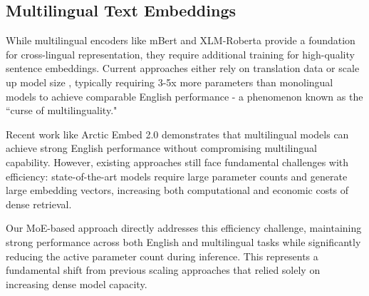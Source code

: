 \subsection{Multilingual Text Embeddings}
While multilingual encoders like mBert \citep{devlin2019bert} and XLM-Roberta \citep{conneau2020unsupervisedcrosslingualrepresentationlearning} provide a foundation for cross-lingual representation, they require additional training for high-quality sentence embeddings. Current approaches either rely on translation data \citep{reimers2020makingmonolingualsentenceembeddings} or scale up model size \citep{wang2024multilinguale5textembeddings, chen2024bgem3embeddingmultilingualmultifunctionality}, typically requiring 3-5x more parameters than monolingual models to achieve comparable English performance - a phenomenon known as the ``curse of multilinguality."

Recent work like Arctic Embed 2.0 \citep{yu2024arcticembed20multilingualretrieval} demonstrates that multilingual models can achieve strong English performance without compromising multilingual capability. However, existing approaches still face fundamental challenges with efficiency: state-of-the-art models require large parameter counts and generate large embedding vectors, increasing both computational and economic costs of dense retrieval.

Our MoE-based approach directly addresses this efficiency challenge, maintaining strong performance across both English and multilingual tasks while significantly reducing the active parameter count during inference. This represents a fundamental shift from previous scaling approaches that relied solely on increasing dense model capacity.




